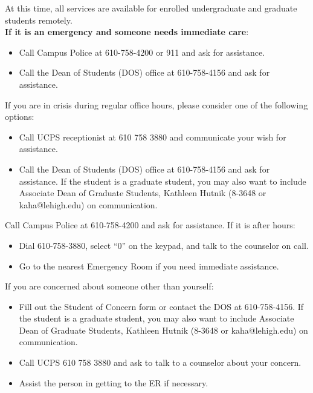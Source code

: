 \documentclass[11pt,letterpaper]{article}
\begin{document}
At this time, all services are available for enrolled undergraduate and graduate students remotely.\\[0.3cm]

\noindent \textbf{If it is an emergency and someone needs immediate care}:
\begin{itemize}
    \item Call Campus Police at 610-758-4200 or 911 and ask for assistance.
    \item Call the Dean of Students (DOS) office at 610-758-4156 and ask for assistance.
\end{itemize}

\noindent If you are in crisis during regular office hours, please consider one of the following options:

\begin{itemize}
    \item Call UCPS receptionist at 610 758 3880 and communicate your wish for assistance.
    \item Call the Dean of Students (DOS) office at 610-758-4156 and ask for assistance. If the student is a graduate student, you may also want to include Associate Dean of Graduate Students, Kathleen Hutnik (8-3648 or kaha@lehigh.edu) on communication.
\end{itemize}
 
\noindent Call Campus Police at 610-758-4200 and ask for assistance. 
If it is after hours:

\begin{itemize}
    \item Dial 610-758-3880, select “0” on the keypad, and talk to the counselor on call.
    \item Go to the nearest Emergency Room if you need immediate assistance.
\end{itemize}

\noindent If you are concerned about someone other than yourself:

\begin{itemize}
    \item Fill out the Student of Concern form or contact the DOS at 610-758-4156. If the student is a graduate student, you may also want to include Associate Dean of Graduate Students, Kathleen Hutnik (8-3648 or kaha@lehigh.edu) on communication.
    \item Call UCPS 610 758 3880 and ask to talk to a counselor about your concern.
    \item Assist the person in getting to the ER if necessary.
\end{itemize}
\end{document}
